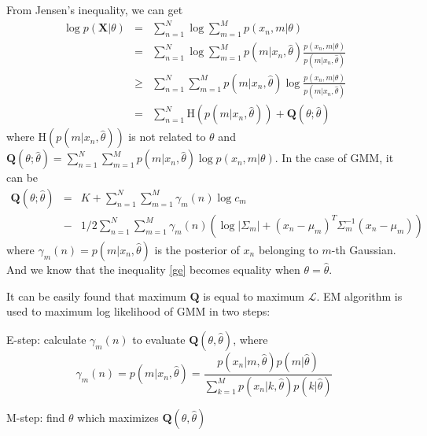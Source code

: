 \documentclass[11pt, oneside]{article}   	%
\begin{document}
From Jensen's inequality, we can get 
\begin{eqnarray}
\log p(\mathbf{X} | \theta) &=& \sum_{n=1}^N \log \sum_{m=1}^M p (x_n, m| \theta) \\
&=& \sum_{n=1}^N \log \sum_{m=1}^M p(m | x_n, \hat{\theta}) \frac{p (x_n, m| \theta)}{p(m | x_n, \hat{\theta})} \\
&\ge&  \sum_{n=1}^N \sum_{m=1}^M p(m | x_n, \hat{\theta}) \log \frac{p (x_n, m| \theta)}{p(m | x_n, \hat{\theta})} \label{ge} \\
&=& \sum_{n=1}^N \mathrm{H} ( p(m | x_n, \hat{\theta}) ) + \mathbf{Q}(\theta; \hat{\theta})
\end{eqnarray}
where $\mathrm{H} ( p(m | x_n, \hat{\theta}) )$ is not related to $\theta$ and $ \mathbf{Q}(\theta; \hat{\theta}) = \sum_{n=1}^N \sum_{m=1}^M p(m | x_n, \hat{\theta}) \log p (x_n, m| \theta)$. In the case of GMM, it can be
\begin{eqnarray}
\mathbf{Q}(\theta; \hat{\theta}) &=& K + \sum_{n=1}^N \sum_{m=1}^M \gamma_m(n)\log c_m \\
&-& 1/2 \sum_{n=1}^N \sum_{m=1}^M \gamma_m(n) (\log |\Sigma_m| + (x_n - \mu_m)^T \Sigma_m ^{-1} (x_n - \mu_m))
\end{eqnarray}
where $\gamma_m(n) = p( m|x_n, \hat{\theta} )$ is the posterior of $x_n$ belonging to $m$-th Gaussian.  And we know that the inequality \ref{ge} becomes equality when $\theta = \hat{\theta}$. 

It can be easily found that maximum $\mathbf{Q}$ is equal to maximum $\mathcal{L}$. EM algorithm is used to maximum log likelihood of GMM in two steps: 

E-step: calculate $\gamma_m(n)$ to evaluate  $\mathbf{Q} (\theta, \hat{\theta})$, where 
\begin{equation}
\gamma_m(n) = p(m|x_n,  \hat{\theta}) = \frac{p(x_n|m, \hat{\theta}) p(m|\hat{\theta})}{\sum_{k=1}^M p(x_n|k, \hat{\theta})p(k|\hat{\theta})}
\end{equation}

M-step: find $\theta$ which maximizes $\mathbf{Q} (\theta, \hat{\theta})$
\end{document}
